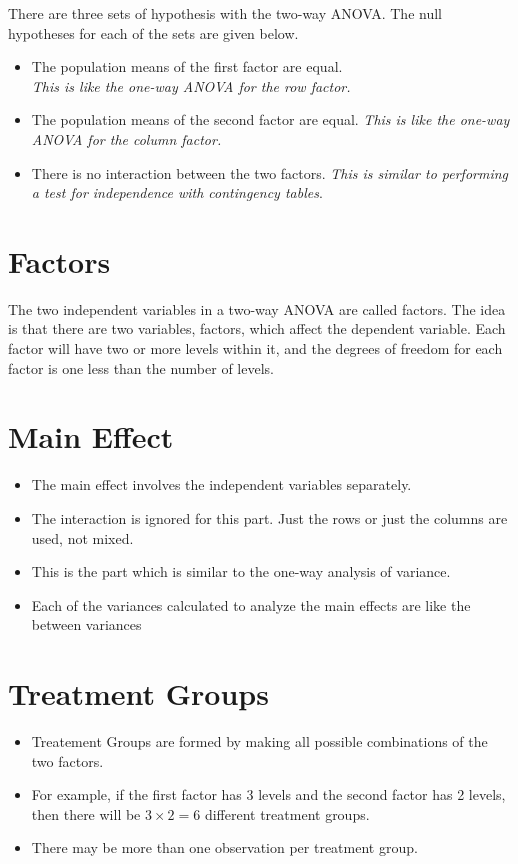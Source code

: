 \documentclass[]{article}
\begin{document}
There are three sets of hypothesis with the two-way ANOVA. The null hypotheses for each of the sets are given below.

\begin{itemize}
\item The population means of the first factor are equal. \\ \textit{This is like the one-way ANOVA for the row factor.}
\item The population means of the second factor are equal. \textit{This is like the one-way ANOVA for the column factor.}
\item There is no interaction between the two factors. \textit{This is similar to performing a test for independence with contingency tables}.
\end{itemize}

\section{Factors}

The two independent variables in a two-way ANOVA are called factors. The idea is that there are two variables, factors, which affect the dependent variable. Each factor will have two or more levels within it, and the degrees of freedom for each factor is one less than the number of levels.

\section{Main Effect}

\begin{itemize}
\item The main effect involves the independent variables separately. 
\item The interaction is ignored for this part. Just the rows or just the columns are used, not mixed. 
\item This is the part which is similar to the one-way analysis of variance. 
\item Each of the variances calculated to analyze the main effects are like the between variances
\end{itemize}



\section{Treatment Groups}
\begin{itemize}
	\item Treatement Groups are formed by making all possible combinations of the two factors. 
	\item For example, if the first factor has 3 levels and the second factor has 2 levels, then there will be $3\times 2=6$ different treatment groups.
	\item There may be more than one observation per treatment group.
\end{itemize}
\end{document}
